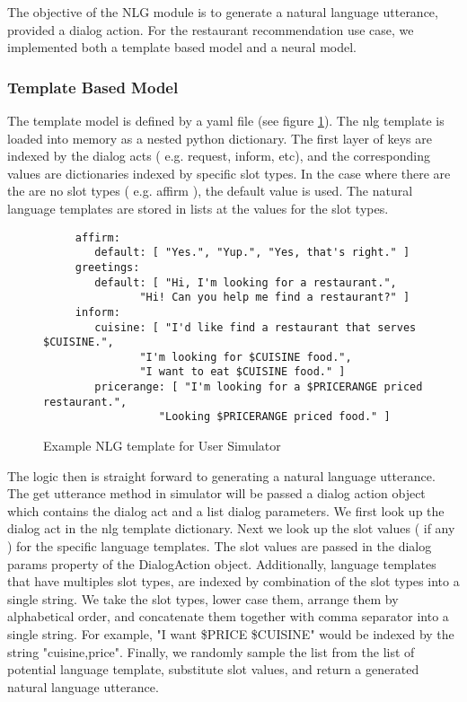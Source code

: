 The objective of the NLG module is to generate a natural language utterance, provided a dialog action. For the restaurant recommendation use case, we implemented both a template based model and a neural model. 

\subsubsection{Template  Based Model}

The template model is defined by a yaml file (see figure \ref{fig:res_nlg}). The nlg template is loaded into memory as a nested python dictionary. The first layer of keys are indexed by the dialog acts ( e.g. request, inform, etc), and the corresponding values are dictionaries indexed by specific slot types. In the case where there are the are no slot types ( e.g. affirm ), the default value is used. The natural language templates are stored in lists at the values for the slot types.

\begin{figure}[h!]
	\caption{ Example NLG template for User Simulator }
	\label{fig:res_nlg}
	\begin{lstlisting}
	 affirm:
		default: [ "Yes.", "Yup.", "Yes, that's right." ]
	 greetings:
		default: [ "Hi, I'm looking for a restaurant.",
			   "Hi! Can you help me find a restaurant?" ]
	 inform:
		cuisine: [ "I'd like find a restaurant that serves $CUISINE.",
			   "I'm looking for $CUISINE food.",
			   "I want to eat $CUISINE food." ]
		pricerange: [ "I'm looking for a $PRICERANGE priced restaurant.",
			      "Looking $PRICERANGE priced food." ]	
	\end{lstlisting}
\end{figure}

The logic then is straight forward to generating a natural language utterance. The get utterance method in simulator will be passed a dialog action object which contains the dialog act and a list dialog parameters. We first look up the dialog act in the nlg template dictionary. Next we look up the slot values ( if any ) for the specific language templates. The slot values are passed in the dialog params property of the DialogAction object. Additionally, language templates that have multiples slot types, are indexed by combination of the slot types into a single string. We take the slot types, lower case them, arrange them by alphabetical order, and concatenate them together with comma separator into a single string. For example, "I want \$PRICE \$CUISINE" would be indexed by the string "cuisine,price". Finally, we randomly sample the list from the list of potential language template, substitute slot values, and return a generated natural language utterance. 


